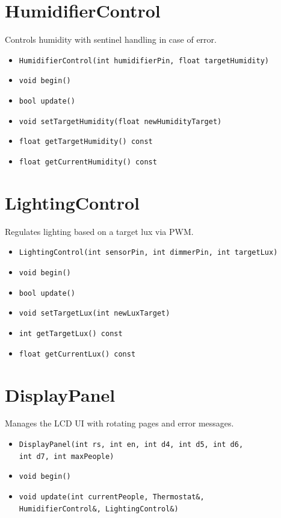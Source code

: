 \section{HumidifierControl}
Controls humidity with sentinel handling in case of error.
\begin{itemize}
  \item \texttt{HumidifierControl(int humidifierPin, float targetHumidity)}
  \item \texttt{void begin()}
  \item \texttt{bool update()}
  \item \texttt{void setTargetHumidity(float newHumidityTarget)}
  \item \texttt{float getTargetHumidity() const}
  \item \texttt{float getCurrentHumidity() const}
\end{itemize}

\section{LightingControl}
Regulates lighting based on a target lux via PWM.
\begin{itemize}
  \item \texttt{LightingControl(int sensorPin, int dimmerPin, int targetLux)}
  \item \texttt{void begin()}
  \item \texttt{bool update()}
  \item \texttt{void setTargetLux(int newLuxTarget)}
  \item \texttt{int getTargetLux() const}
  \item \texttt{float getCurrentLux() const}
\end{itemize}

\section{DisplayPanel}
Manages the LCD UI with rotating pages and error messages.
\begin{itemize}
  \item \texttt{DisplayPanel(int rs, int en, int d4, int d5, int d6,}\\
        \texttt{int d7, int maxPeople)}
  \item \texttt{void begin()}
  \item \texttt{void update(int currentPeople, Thermostat\&,}\\
        \texttt{HumidifierControl\&, LightingControl\&)}
\end{itemize}

